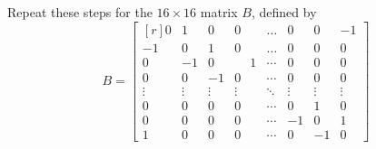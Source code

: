 Repeat these steps for the $16 \times 16$ matrix $B$, defined by
\begin{equation}
B = \begin{bmatrix*}[r] 0 & 1 & 0 & 0 & \dots & 0 & 0 & -1 \\ -1 & 0 & 1 & 0 & \dots& 0 & 0 & 0 \\ 0 & -1 & 0 & \phantom{+}1 & \cdots&0 & 0 & 0 \\ 0 & 0 & -1 & 0 & \cdots&0 & 0 & 0 \\ \vdots & \vdots & \vdots & \vdots & \ddots & \vdots & \vdots & \vdots \\ 0 & 0 & 0 & 0 & \cdots & 0 & 1 & 0 \\ 0 & 0 & 0 & 0 & \cdots & -1 & 0 & 1\\ 1 & 0 & 0 & 0 & \cdots & 0 & -1 & 0 \end{bmatrix*}
\end{equation}
